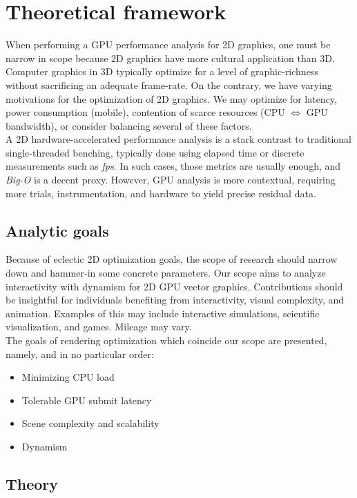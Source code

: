 \section{Theoretical framework}

When performing a GPU performance analysis for 2D graphics, one must be narrow in scope because 2D graphics have more cultural application than 3D. Computer graphics in 3D typically optimize for a level of graphic-richness without sacrificing an adequate frame-rate. On the contrary, we have varying motivations for the optimization of 2D graphics. We may optimize for latency, power consumption (mobile), contention of scarce resources (CPU $\Leftrightarrow$ GPU bandwidth), or consider balancing several of these factors.\\

A 2D hardware-accelerated performance analysis is a stark contrast to traditional single-threaded benching, typically done using elapsed time or discrete measurements such as \emph{fps}. In such cases, those metrics are usually enough, and \emph{Big-O} is a decent proxy. However, GPU analysis is more contextual, requiring more trials, instrumentation, and hardware to yield precise residual data.

\subsection{Analytic goals}
Because of eclectic 2D optimization goals, the scope of research should narrow down and hammer-in some concrete parameters. Our scope aims to analyze interactivity with dynamism for 2D GPU vector graphics. Contributions should be insightful for individuals benefiting from interactivity, visual complexity, and animation. Examples of this may include interactive simulations, scientific visualization, and games. Mileage may vary.\\

The goals of rendering optimization which coincide our scope are presented, namely, and in no particular order:
\begin{itemize}
  \item Minimizing CPU load
  \item Tolerable GPU submit latency
  \item Scene complexity and scalability
  \item Dynamism
\end{itemize}

\subsection{Theory}

